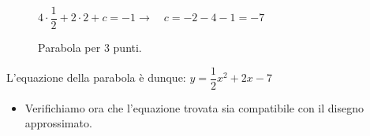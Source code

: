 \begin{esempio}
\begin{figure}[h]
\begin{minipage}{.60\textwidth}
\begin{itemize}
\(4 \cdot \dfrac{1}{2} +2 \cdot 2 +c=-1 \rightarrow \quad c=-2-4-1=-7\)

 \end{itemize}

\end{minipage}
\begin{minipage}{.40\textwidth}
\begin{inaccessibleblock}[Parabola di equazione \(y=x^2\).]
\centering
\scalebox{.8}{  \parabolapertrepunti}
  \caption{Parabola per 3 punti.} \label{fig:parabola_parabola3punti}
\end{inaccessibleblock}
\end{minipage}
\end{figure}
L'equazione della parabola è dunque: \(y=\dfrac{1}{2}x^2+2x-7\)

 \begin{itemize}
  \item Verifichiamo ora che l'equazione trovata sia compatibile con il
  disegno approssimato.
 \end{itemize}
\end{esempio}


